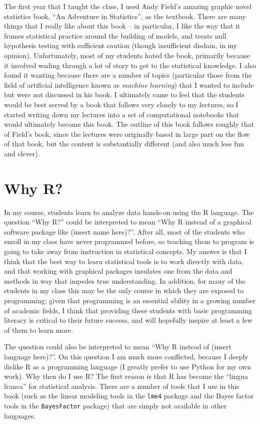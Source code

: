 \documentclass[12pt,]{book}
\theoremstyle{definition}
\theoremstyle{definition}
\theoremstyle{definition}
\theoremstyle{remark}
\begin{document}
The first year that I taught the class, I used Andy Field's amazing graphic novel statistics book, ``An Adventure in Statistics'', as the textbook. There are many things that I really like about this book -- in particular, I like the way that it frames statistical practice around the building of models, and treats null hypothesis testing with sufficient caution (though insufficient disdain, in my opinion). Unfortunately, most of my students hated the book, primarily because it involved wading through a lot of story to get to the statistical knowledge. I also found it wanting because there are a number of topics (particular those from the field of artificial intelligence known as \emph{machine learning}) that I wanted to include but were not discussed in his book. I ultimately came to feel that the students would be best served by a book that follows very closely to my lectures, so I started writing down my lectures into a set of computational notebooks that would ultimately become this book. The outline of this book follows roughly that of Field's book, since the lectures were originally based in large part on the flow of that book, but the content is substantially different (and also much less fun and clever).

\hypertarget{why-r}{%
\section{Why R?}\label{why-r}}

In my course, students learn to analyze data hands-on using the R language. The question ``Why R?'' could be interpreted to mean ``Why R instead of a graphical software package like (insert name here)?''. After all, most of the students who enroll in my class have never programmed before, so teaching them to program is going to take away from instruction in statistical concepts. My answer is that I think that the best way to learn statistical tools is to work directly with data, and that working with graphical packages insulates one from the data and methods in way that impedes true understanding. In addition, for many of the students in my class this may be the only course in which they are exposed to programming; given that programming is an essential ability in a growing number of academic fields, I think that providing these students with basic programming literacy is critical to their future success, and will hopefully inspire at least a few of them to learn more.

The question could also be interpreted to mean ``Why R instead of (insert language here)?''. On this question I am much more conflicted, because I deeply dislike R as a programming language (I greatly prefer to use Python for my own work). Why then do I use R? The first reason is that R has become the ``lingua franca'' for statistical analysis. There are a number of tools that I use in this book (such as the linear modeling tools in the \texttt{lme4} package and the Bayes factor tools in the \texttt{BayesFactor} package) that are simply not available in other languages.
\end{document}
